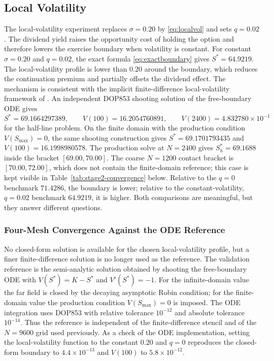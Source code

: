 \documentclass[11pt,a4paper]{article}
\theoremstyle{definition}
\theoremstyle{remark}
\begin{document}
\subsection{Local Volatility}
\label{sec:localvol}
The local-volatility experiment replaces $\sigma=0.20$ by
\eqref{eq:localvol} and sets $q=0.02$. The dividend yield raises the
opportunity cost of holding the option and therefore lowers the exercise
boundary when volatility is constant. For constant $\sigma=0.20$ and
$q=0.02$, the exact formula \eqref{eq:exactboundary} gives $S^*=64.9219$.
The local-volatility profile is lower than $0.20$ around the boundary, which
reduces the continuation premium and partially offsets the dividend effect.
The mechanism is consistent with the implicit finite-difference
local-volatility framework of \cite{ref8}.
An independent DOP853 shooting solution of the free-boundary ODE gives
\begin{equation}
    S^*=69.1664297389,
    \qquad
    V(100)=16.2054760891,
    \qquad
    V(2400)=4.832780\times10^{-1}
    \label{eq:stage2-reference}
\end{equation}
for the half-line problem. On the finite domain with the production
condition \(V(S_{\max})=0\), the same shooting construction gives
\(S^*=69.1701793435\) and \(V(100)=16.1998980578\). The production solve at
\(N=2400\) gives \(S_h^*=69.1688\) inside the bracket \([69.00,70.00]\).
The coarse \(N=1200\) contact bracket is \([70.00,72.00]\), which does not
contain the finite-domain reference; this case is kept visible in
Table~\ref{tab:stage2-convergence} below.
Relative to the \(q=0\) benchmark \(71.4286\), the boundary is lower;
relative to the constant-volatility, \(q=0.02\) benchmark \(64.9219\), it
is higher. Both comparisons are meaningful, but they answer different
questions.

\subsubsection{Four-Mesh Convergence Against the ODE Reference}
\label{sec:stage2-convergence}
No closed-form solution is available for the chosen local-volatility
profile, but a finer finite-difference solution is no longer used as the
reference. The validation reference is the semi-analytic solution obtained
by shooting the free-boundary ODE with $V(S^*)=K-S^*$ and $V'(S^*)=-1$.
For the infinite-domain value the far field is closed by the decaying
asymptotic Robin condition; for the finite-domain value the production
condition \(V(S_{\max})=0\) is imposed. The ODE integration uses DOP853 with
relative tolerance $10^{-12}$ and absolute tolerance $10^{-14}$. Thus the
reference is independent of the finite-difference stencil and of the
$N=9600$ grid used previously. As a check of the ODE implementation, setting
the local-volatility function to the constant $0.20$ and $q=0$ reproduces the
closed-form boundary to $4.4\times10^{-13}$ and $V(100)$ to
$5.8\times10^{-12}$.
\end{document}
